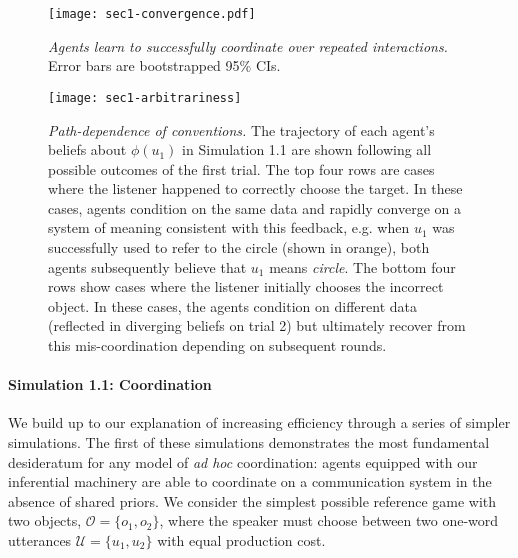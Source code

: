 \begin{figure}
\centering
    \texttt{[image: sec1-convergence.pdf]}
  \caption{\emph{Agents learn to successfully coordinate over repeated interactions.} Error bars are bootstrapped 95\% CIs.}
  \label{fig:sec1model}
\end{figure}

  \begin{figure*}
\centering
    \texttt{[image: sec1-arbitrariness]}
    \vspace{1em}
  \caption{\emph{Path-dependence of conventions.} The trajectory of each agent's beliefs about $\phi(u_1)$ in Simulation 1.1 are shown following all possible outcomes of the first trial. The top four rows are cases where the listener happened to correctly choose the target. In these cases, agents condition on the same data and rapidly converge on a system of meaning consistent with this feedback, e.g. when $u_1$ was successfully used to refer to the circle (shown in orange), both agents subsequently believe that $u_1$ means \emph{circle}. The bottom four rows show cases where the listener initially chooses the incorrect object. In these cases, the agents condition on different data (reflected in diverging beliefs on trial 2) but ultimately recover from this mis-coordination depending on subsequent rounds.}
  \label{fig:path-dependence}
\end{figure*}

\paragraph{Simulation 1.1: Coordination}

We build up to our explanation of increasing efficiency through a series of simpler simulations.
The first of these simulations demonstrates the most fundamental desideratum for any model of \emph{ad hoc} coordination: agents equipped with our inferential machinery are able to coordinate on a communication system in the absence of shared priors. 
We consider the simplest possible reference game with two objects, $\mathcal{O} = \{o_1, o_2\}$, where the speaker must choose between two one-word utterances $\mathcal{U} = \{u_1, u_2\}$ with equal production cost. 

